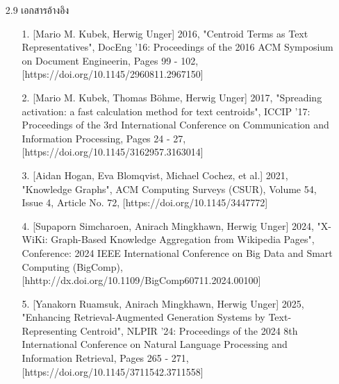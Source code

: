 \documentclass[12pt,a4paper]{article}
\newcommand{\textlight}[1]{{\thailightfont #1}}
\begin{document}
\begin{enumerate}[leftmargin=2cm]
    \item[2.9] เอกสารอ้างอิง
    \\
    \textlight{
        \begin{enumerate}
            \item[1.] [Mario M. Kubek, Herwig Unger] 2016, "Centroid Terms as Text Representatives", DocEng '16: Proceedings of the 2016 ACM Symposium on Document Engineerin, Pages 99 - 102, [https://doi.org/10.1145/2960811.2967150]
            \item[2.] [Mario M. Kubek, Thomas Böhme, Herwig Unger] 2017, "Spreading activation: a fast calculation method for text centroids", ICCIP '17: Proceedings of the 3rd International Conference on Communication and Information Processing, Pages 24 - 27, [https://doi.org/10.1145/3162957.3163014]
            \item[3.] [Aidan Hogan, Eva Blomqvist, Michael Cochez, et al.] 2021, "Knowledge Graphs", ACM Computing Surveys (CSUR), Volume 54, Issue 4, Article No. 72, [https://doi.org/10.1145/3447772]
            \item[4.] [Supaporn Simcharoen, Anirach Mingkhawn, Herwig Unger] 2024, "X-WiKi: Graph-Based Knowledge Aggregation from Wikipedia Pages", Conference: 2024 IEEE International Conference on Big Data and Smart Computing (BigComp), [hhttp://dx.doi.org/10.1109/BigComp60711.2024.00100]
            \item[5.] [Yanakorn Ruamsuk, Anirach Mingkhawn, Herwig Unger] 2025, "Enhancing Retrieval-Augmented Generation Systems by Text-Representing Centroid", NLPIR '24: Proceedings of the 2024 8th International Conference on Natural Language Processing and Information Retrieval, Pages 265 - 271, [https://doi.org/10.1145/3711542.3711558]
        \end{enumerate}
    }

    \vspace{2cm}


\end{enumerate}
\end{document}
